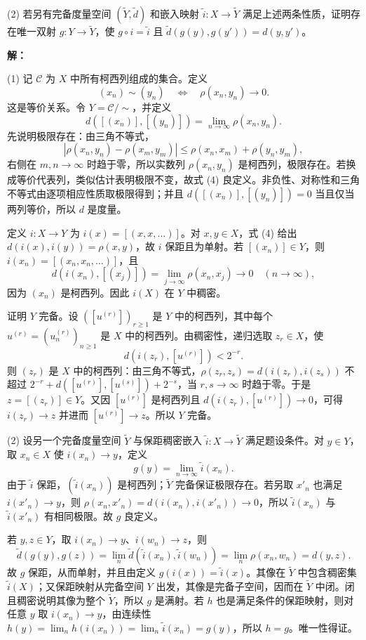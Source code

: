 \documentclass{article}
\begin{document}
(2) 若另有完备度量空间 $(\widetilde Y,\widetilde d)$ 和嵌入映射 $\widetilde i:X\to\widetilde Y$ 满足上述两条性质，证明存在唯一双射 $g:Y\to\widetilde Y$，使 $g\circ i=\widetilde i$ 且 $\widetilde d(g(y),g(y'))=d(y,y')$。

\textbf{解：}

(1) 记 $\mathscr C$ 为 $X$ 中所有柯西列组成的集合。定义
\[
(x_n)\sim(y_n)\quad\Longleftrightarrow\quad\rho(x_n,y_n)\longrightarrow0.
\]
这是等价关系。令 $Y=\mathscr C/{\sim}$，并定义
\[
d([(x_n)],[(y_n)])=\lim_{n\to\infty}\rho(x_n,y_n).
\tag{4}
\]
先说明极限存在：由三角不等式，
\[
|\rho(x_n,y_n)-\rho(x_m,y_m)|\leq\rho(x_n,x_m)+\rho(y_n,y_m),
\]
右侧在 $m,n\to\infty$ 时趋于零，所以实数列 $\rho(x_n,y_n)$ 是柯西列，极限存在。若换成等价代表列，类似估计表明极限不变，故式 (4) 良定义。非负性、对称性和三角不等式由逐项相应性质取极限得到；并且 $d([(x_n)],[(y_n)])=0$ 当且仅当两列等价，所以 $d$ 是度量。

定义 $i:X\to Y$ 为 $i(x)=[(x,x,\ldots)]$。对 $x,y\in X$，式 (4) 给出 $d(i(x),i(y))=\rho(x,y)$，故 $i$ 保距且为单射。若 $[(x_n)]\in Y$，则 $i(x_n)=[(x_n,x_n,\ldots)]$，且
\[
d(i(x_n),[(x_j)])=\lim_{j\to\infty}\rho(x_n,x_j)\longrightarrow0\quad(n\to\infty),
\]
因为 $(x_n)$ 是柯西列。因此 $i(X)$ 在 $Y$ 中稠密。

证明 $Y$ 完备。设 $([u^{(r)}])_{r\geq1}$ 是 $Y$ 中的柯西列，其中每个 $u^{(r)}=(u^{(r)}_n)_{n\geq1}$ 是 $X$ 中的柯西列。由稠密性，递归选取 $z_r\in X$，使
\[
d(i(z_r),[u^{(r)}])<2^{-r}.
\]
则 $(z_r)$ 是 $X$ 中的柯西列：由三角不等式，$\rho(z_r,z_s)=d(i(z_r),i(z_s))$ 不超过
\(2^{-r}+d([u^{(r)}],[u^{(s)}])+2^{-s}\)，当 $r,s\to\infty$ 时趋于零。于是 $z=[(z_r)]\in Y$。又因 $[u^{(r)}]$ 是柯西列且 $d(i(z_r),[u^{(r)}])\to0$，可得 $i(z_r)\to z$ 并进而 $[u^{(r)}]\to z$。所以 $Y$ 完备。

(2) 设另一个完备度量空间 $\widetilde Y$ 与保距稠密嵌入 $\tilde i:X\to\widetilde Y$ 满足题设条件。对 $y\in Y$，取 $x_n\in X$ 使 $i(x_n)\to y$，定义
\[
g(y)=\lim_{n\to\infty}\tilde i(x_n).
\]
由于 $\tilde i$ 保距，$(\tilde i(x_n))$ 是柯西列；$\widetilde Y$ 完备保证极限存在。若另取 $x'_n$ 也满足 $i(x'_n)\to y$，则
\(\rho(x_n,x'_n)=d(i(x_n),i(x'_n))\to0\)，所以 $\tilde i(x_n)$ 与 $\tilde i(x'_n)$ 有相同极限。故 $g$ 良定义。

若 $y,z\in Y$，取 $i(x_n)\to y$、$i(w_n)\to z$，则
\[
\tilde d(g(y),g(z))=\lim_n\tilde d(\tilde i(x_n),\tilde i(w_n))
=\lim_n\rho(x_n,w_n)=d(y,z).
\]
故 $g$ 保距，从而单射，并且由定义 $g(i(x))=\tilde i(x)$。其像在 $\widetilde Y$ 中包含稠密集 $\tilde i(X)$；又保距映射从完备空间 $Y$ 出发，其像是完备子空间，因而在 $\widetilde Y$ 中闭。闭且稠密说明其像为整个 $\widetilde Y$，所以 $g$ 是满射。若 $h$ 也是满足条件的保距映射，则对任意 $y$ 取 $i(x_n)\to y$，由连续性
\(h(y)=\lim_n h(i(x_n))=\lim_n\tilde i(x_n)=g(y)\)，所以 $h=g$。唯一性得证。
\end{document}
